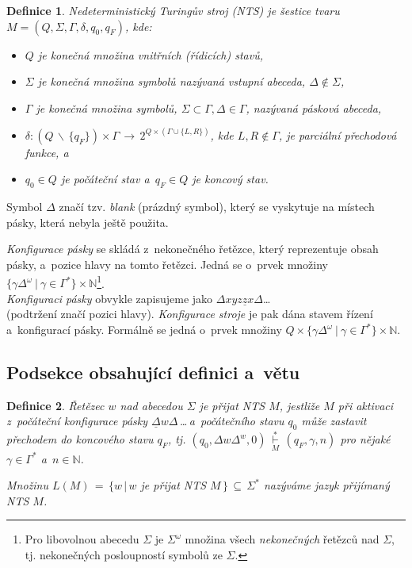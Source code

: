 \documentclass[twocolumn, a4paper, 11pt]{article}
\newtheorem{definition}{Definice}
\begin{document}
\begin{definition}
    \emph{Nedeterministický Turingův stroj} (NTS) je šestice tvaru $M = (Q, \Sigma, \Gamma, \delta, q_0, q_F)$, kde:
    \begin{itemize}
        \item $Q$ je konečná množina \emph{vnitřních (řídicích) stavů,}
        \item $\Sigma$ je konečná množina symbolů nazývaná \emph{vstupní abeceda, $\Delta \notin \Sigma$,}
        \item $\Gamma$ je konečná množina symbolů, $\Sigma \subset \Gamma, \Delta \in \Gamma$, nazývaná \emph{pásková abeceda,}
        \item $\delta : (Q\,\backslash\,\{q_F\}) \times \Gamma\,\rightarrow\,2^{Q \times (\Gamma \cup \{L, R\})}$, kde ${L, R \notin \Gamma}$, je parciální \emph{přechodová funkce}, a
        \item $q_0 \in Q$ je \emph{počáteční stav} a~${q_F \in Q}$ je \emph{koncový stav.}
    \end{itemize}
\end{definition}

Symbol $\Delta$ značí tzv. \emph{blank} (prázdný symbol), který se vyskytuje na místech pásky, která nebyla ještě použita.

\emph{Konfigurace pásky} se skládá z~nekonečného řetězce, který reprezentuje obsah pásky, a~pozice hlavy na tomto řetězci.
Jedná se o~prvek množiny ${\{\gamma\Delta^{\omega}~|~\gamma \in \Gamma^*\}\times\mathbb{N}}$\footnote{Pro libovolnou abecedu $\Sigma$ je $\Sigma^{\omega}$ množina všech \emph{nekonečných} řetězců nad $\Sigma$, tj. nekonečných posloupností symbolů ze $\Sigma$.}. \\
\emph{Konfiguraci pásky} obvykle zapisujeme jako $\Delta xyz\underline{z}x\Delta$\dots \\ (podtržení značí pozici hlavy).
\emph{Konfigurace stroje} je pak dána stavem řízení a~konfigurací pásky.
Formálně se jedná o~prvek množiny ${Q\times\{\gamma\Delta^{\omega}~|~\gamma \in \Gamma^*\}\times\mathbb{N}}$.

\subsection{Podsekce obsahující definici a~větu}
\begin{definition}
    \label{def2}
    \emph{Řetězec} $w$ \emph{nad abecedou} $\Sigma$ \emph{je přijat NTS} $M$, jestliže $M$ při aktivaci z~počáteční konfigurace pásky $\underline{\Delta}w\Delta$\,\dots\,a~počátečního stavu $q_0$ může zastavit přechodem do koncového stavu $q_F$, tj. $(q_0, \Delta w\Delta^w, 0)\,\underset{M}{\overset{*}{\vdash}}\,(q_F, \gamma, n)$ pro nějaké $\gamma \in \Gamma^*$ a~$n \in \mathbb{N}$.
    
    Množinu $L(M)\,=\,\{w\,|\,w$ je přijat NTS $M\,\}\,\subseteq\,\Sigma^*$ nazýváme \emph{jazyk přijímaný NTS} $M$.
\end{definition}
\end{document}

